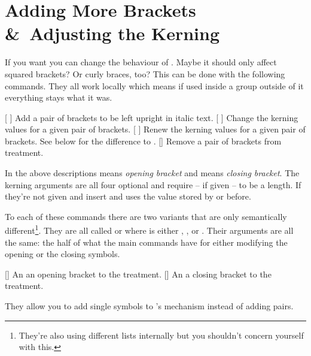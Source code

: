 \documentclass[load-preamble+]{cnltx-doc}
\begin{document}
\section{Adding More Brackets \&\ Adjusting the Kerning}
If you want you can change the behaviour of \embrac.  Maybe it should only
affect squared brackets?  Or curly braces, too?  This can be done with the
following commands.  They all work locally which means if used inside a group
outside of it everything stays what it was.
\begin{commands}
  [%
    ]
    Add a pair of brackets to be left upright in italic text.
  [%
    ]
    Change the kerning values for a given pair of brackets.
  [%
    ]
    Renew the kerning values for a given pair of brackets.  See below for the
    difference to .
  []
    Remove a pair of brackets from treatment.
\end{commands}
In the above descriptions  means \emph{opening bracket} and 
means \emph{closing bracket}.  The kerning arguments are all four optional and
require -- if given -- to be a length.  If they're not given  and
 insert \code{0pt} and  uses the value stored by
 or  before.

To each of these commands there are two variants that are
only semantically different\footnote{They're also using different lists
  internally but you shouldn't concern yourself with this.}.  They are all
called  or  where  is
either , ,  or .  Their
arguments are all the same: the half of what the main commands have for either
modifying the opening or the closing symbols.
\begin{commands}
  []
    An an opening bracket to the treatment.
  []
    An a closing bracket to the treatment.
\end{commands}
They allow you to add single symbols to \embrac's mechanism instead of adding
pairs.
\end{document}
